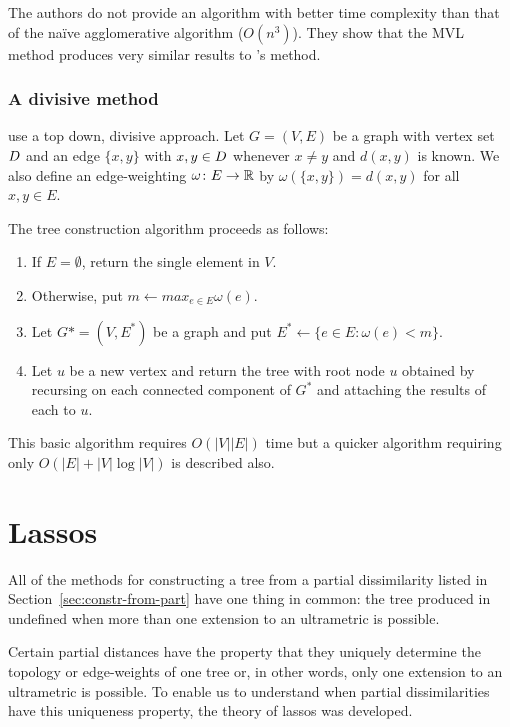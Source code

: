The authors do not provide an algorithm with better time complexity than that
of the naïve agglomerative algorithm ($O(n^3)$).  They show that the MVL
method produces very similar results to \citeauthor{de1984ultrametric}'s
method.

\subsubsection{A divisive method}
\label{sec:part-dist-divisive-method}

\citet{farach1995robust} use a top down, divisive approach.  Let $G=(V,E)$ be
a graph with vertex set $D$ and an edge $\{x,y\}$ with $x,y \in D$
whenever $x \neq y$ and $d(x,y)$ is known.  We also define an edge-weighting
$\omega \colon E \to {\mathbb R}$ by $\omega(\{x,y\}) = d(x,y)$ for all $x,y \in E$.

The tree construction algorithm proceeds as follows:
\begin{enumerate}
\item If $E = \emptyset$, return the single element in $V$.
\item Otherwise, put $m \gets max_{e \in E} \omega(e)$.
\item Let $G* = (V,E^*)$ be a graph and put $E^* \gets \{e \in E \colon
  \omega(e) < m\}$.
\item Let $u$ be a new vertex and return the tree with root node $u$ obtained
  by recursing on each connected component of $G^*$ and attaching the results
  of each to $u$.
\end{enumerate}
This basic algorithm requires $O(|V||E|)$ time but a quicker algorithm
requiring only $O(|E| + |V|\log |V|)$ is described also.

\section{Lassos}
\label{sec:lassoing-corralling}

All of the methods for constructing a tree from a partial dissimilarity listed
in Section~\ref{sec:constr-from-part} have one thing in common: the tree
produced in undefined when more than one extension to an ultrametric is
possible.

Certain partial distances have the property that they uniquely determine the
topology or edge-weights of one tree or, in other words, only one extension to
an ultrametric is possible.  To enable us to understand when partial
dissimilarities have this uniqueness property, the theory of lassos was
developed.

